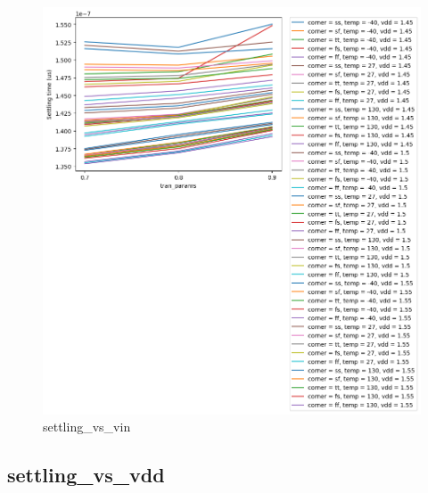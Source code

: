\documentclass[
  a4paper,
  DIV=11,
  numbers=noendperiod]{scrartcl}
\begin{document}
\begin{tcolorbox}
\begin{figure}[H]
{\centering \includegraphics{./cace/_docs/ota-5t/schematic/settling_vs_vin.png}

}

\caption{settling\_vs\_vin}

\end{figure}%

\subsection*{settling\_vs\_vdd}\label{settling_vs_vdd}

\begin{figure}[H]


\end{figure}
\end{tcolorbox}
\end{document}
